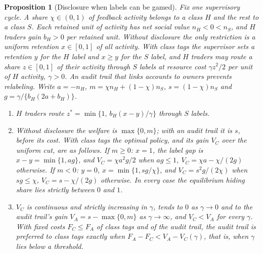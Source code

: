 \documentclass[12pt]{article}
\newtheorem{proposition}[theorem]{Proposition}
\theoremstyle{definition}
\theoremstyle{remark}
\begin{document}
\begin{proposition}[Disclosure when labels can be gamed]\label{n:relabel}
Fix one supervisory cycle. A share $\chi\in(0,1)$ of feedback activity belongs to a class $H$ and the rest to a class $S$. Each retained unit of activity has net social value $n_H<0<n_S$, and $H$ traders gain $b_H>0$ per retained unit. Without disclosure the only restriction is a uniform retention $x\in[0,1]$ of all activity. With class tags the supervisor sets a retention $y$ for the $H$ label and $x\ge y$ for the $S$ label, and $H$ traders may route a share $z\in[0,1]$ of their activity through $S$ labels at resource cost $\gamma z^2/2$ per unit of $H$ activity, $\gamma>0$. An audit trail that links accounts to owners prevents relabeling. Write $a=-n_H$, $m=\chi n_H+(1-\chi)n_S$, $s=(1-\chi)n_S$ and $g=\gamma/\{b_H(2a+b_H)\}$.
\begin{enumerate}[label=(\roman*),itemsep=1pt]
\item $H$ traders route $z^*=\min\{1,\,b_H(x-y)/\gamma\}$ through $S$ labels.
\item Without disclosure the welfare is $\max\{0,m\}$; with an audit trail it is $s$, before its cost. With class tags the optimal policy, and its gain $V_C$ over the uniform cut, are as follows. If $m\ge0$: $x=1$, the label gap is $x-y=\min\{1,ag\}$, and $V_C=\chi a^2g/2$ when $ag\le1$, $V_C=\chi a-\chi/(2g)$ otherwise. If $m<0$: $y=0$, $x=\min\{1,sg/\chi\}$, and $V_C=s^2g/(2\chi)$ when $sg\le\chi$, $V_C=s-\chi/(2g)$ otherwise. In every case the equilibrium hiding share lies strictly between $0$ and $1$.
\item $V_C$ is continuous and strictly increasing in $\gamma$, tends to $0$ as $\gamma\to0$ and to the audit trail's gain $V_A=s-\max\{0,m\}$ as $\gamma\to\infty$, and $V_C<V_A$ for every $\gamma$. With fixed costs $F_C\le F_A$ of class tags and of the audit trail, the audit trail is preferred to class tags exactly when $F_A-F_C<V_A-V_C(\gamma)$, that is, when $\gamma$ lies below a threshold.
\end{enumerate}
\end{proposition}
\end{document}
